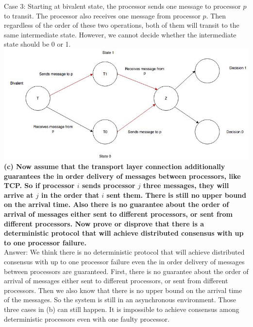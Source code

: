 \documentclass{article}
\begin{document}
Case 3: Starting at bivalent state, the processor sends one message to processor $p$ to transit. The processor also receives one message from processor $p$. Then regardless of the order of these two operations, both of them will transit to the same intermediate state. However, we cannot decide whether the intermediate state should be 0 or 1.\\ \newline
\includegraphics[width=0.9\columnwidth]{case3.jpg}\\ \newline 
\textbf{(c) Now assume that the transport layer connection additionally guarantees the in order delivery of messages between processors, like TCP. So if processor $i$ sends processor $j$ three messages, they will arrive at $j$ in the order that $i$ sent them. There is still no upper bound on the arrival time. Also there is no guarantee about the order of arrival of messages either sent to different processors, or sent from different processors. Now prove or disprove that there is a deterministic protocol that will achieve distributed consensus with up to one processor failure.}\\ \newline
Answer: We think there is no deterministic protocol that will achieve distributed consensus with up to one processor failure even the in order delivery of messages between processors are guaranteed. First, there is no guarantee about the order of arrival of messages either sent to different processors, or sent from different processors. Then we also know that there is no upper bound on the arrival time of the messages. So the system is still in an asynchronous environment. Those three cases in (b) can still happen. It is impossible to achieve consensus among deterministic processors even with one faulty processor. 
\end{document}
